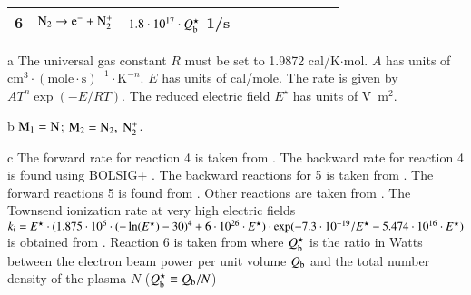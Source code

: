 \documentclass{warpdoc}
\begin{document}
\begin{table}[t]
\begin{center}
\begin{threeparttable}
\begin{tabular}{cccccccccc}
6 & $\rm N_2 \rightarrow e^- + N_2^+$   
       & $1.8 \cdot 10^{17} \cdot Q_{\rm b}^\star$ 1/s \\
\bottomrule
\end{tabular}
\begin{tablenotes}
\item[{a}] The universal gas constant $R$ must be set to 1.9872	cal/K$\cdot$mol. $A$ has units of $\textrm{cm}^3\cdot(\textrm{mole}\cdot \textrm{s})^{-1}\cdot \textrm{K}^{-n}$. $E$ has units of cal/mole. The rate is given by $A T^n \exp(-E/RT).$ The reduced electric field $E^\star$ has units of V~m$^2$.
\item[{b}] $\rm M_1=N$; $\rm M_2=N_2,~N_2^+$.
\item[{c}] The forward rate for reaction 4 is taken from \cite{pf:2007:boyd}. The backward rate for reaction 4 is found using BOLSIG+ \cite{psst:2005:hagelaar,jap:2021:abdoulanziz}. The backward reactions for 5 is taken from \cite{nasa:1973:dunn}. The forward reactions 5 is found from \cite{jcp:2014:parent}. Other reactions are taken from \cite{book:1990:park}. The Townsend ionization rate at very high electric fields $k_{\rm i}=E^\star\cdot(1.875\cdot 10^6 \cdot (-\ln (E^\star)-30)^4+6\cdot 10^{26}\cdot E^\star)\cdot \exp(-7.3\cdot 10^{-19}/E^\star - 5.474\cdot 10^{16}\cdot E^\star)$ is obtained from \cite{ps:2005:tarasenko}. Reaction 6 is taken from \cite{book:1982:bychkov} where $Q^\star_{\rm b}$ is the ratio in Watts between the electron beam power per unit volume $Q_{\rm b}$ and the total number density of the plasma $N$  ($Q^\star_{\rm b}\equiv Q_{\rm b}/N$)
\end{tablenotes}
\label{tab:parent2023b}
\end{threeparttable}
\end{center}
\end{table}
%



~
\newpage





\end{document}
